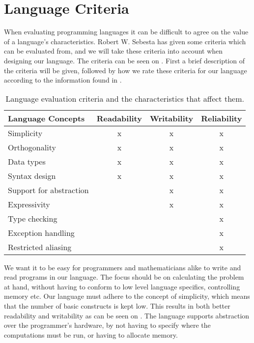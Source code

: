 \chapter{Language Criteria}
When evaluating programming languages it can be difficult to agree on the value of a language's characteristics.
Robert W. Sebesta has given some criteria which can be evaluated from, and we will take these criteria into account when designing our language.\citep{Sebesta}
The criteria can be seen on .
First a brief description of the criteria will be given, followed by how we rate these criteria for our language according to the information found in .
\begin{table}[h]
	\centering
	\begin{tabular}{|l|c|c|c|}
	\hline
	\textbf{Language Concepts} & \textbf{Readability}  & \textbf{Writability} & \textbf{Reliability}   \\ \hline
	Simplicity                 & x      		       & x             		  & x           		   \\ \hline
	Orthogonality              & x 				       & x             		  & x           		   \\ \hline
	Data types                 & x 				       & x             		  & x           		   \\ \hline
	Syntax design              & x 				       & x             		  & x           		   \\ \hline
	Support for abstraction    &                       & x             		  & x           		   \\ \hline
	Expressivity               &                       & x             		  & x           		   \\ \hline
	Type checking              &                       &               		  & x           		   \\ \hline
	Exception handling         &                       &               		  & x           		   \\ \hline
	Restricted aliasing        &                       &               		  & x           		   \\ \hline
	\end{tabular}
	\caption{Language evaluation criteria and the characteristics that affect them.}
	\label{tbl:concepts}
\end{table}

We want it to be easy for programmers and mathematicians alike to write and read programs in our language.
The focus should be on calculating the problem at hand, without having to conform to low level language specifics, controlling memory etc.
Our language must adhere to the concept of simplicity, which means that the number of basic constructs is kept low. 
This results in both better readability and writability as can be seen on .
The language supports abstraction over the programmer's hardware, by not having to specify where the computations must be run, or having to allocate memory.

